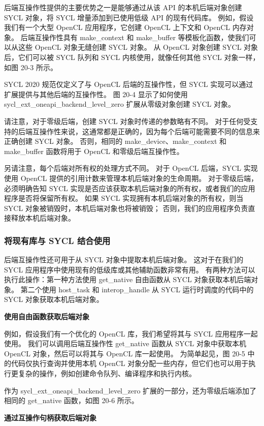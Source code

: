 后端互操作性提供的主要优势之一是能够通过从该 API 的本机后端对象创建 SYCL 对象，将 SYCL 增量添加到已使用低级 API 的现有代码库。 例如，假设我们有一个大型 OpenCL 应用程序，它创建 OpenCL 上下文和 OpenCL 内存对象。 后端互操作性具有 make\_context 和 make\_buffer 等模板化函数，使我们可以从这些 OpenCL 对象无缝创建 SYCL 对象。 从 OpenCL 对象创建 SYCL 对象后，它们可以被 SYCL 队列和 SYCL 内核使用，就像任何其他 SYCL 对象一样，如图 20-3 所示。

SYCL 2020 规范仅定义了与 OpenCL 后端的互操作性，但 SYCL 实现可以通过扩展提供与其他后端的互操作性。 图 20-4 显示了如何使用 sycl\_ext\_oneapi\_backend\_level\_zero 扩展从零级对象创建 SYCL 对象。

请注意，对于零级后端，创建 SYCL 对象时传递的参数略有不同。 对于任何受支持的后端互操作性来说，这通常都是正确的，因为每个后端可能需要不同的信息来正确创建 SYCL 对象。 否则，相同的 make\_device、make\_context 和 make\_buffer 函数将用于 OpenCL 和零级后端互操作性。

另请注意，每个后端对所有权的处理方式不同。 对于 OpenCL 后端，SYCL 实现使用 OpenCL 提供的引用计数来管理本机后端对象的生命周期。 对于零级后端，必须明确告知 SYCL 实现是否应该获取本机后端对象的所有权，或者我们的应用程序是否将保留所有权。 如果 SYCL 实现拥有本机后端对象的所有权，则当 SYCL 对象被销毁时，本机后端对象也将被销毁； 否则，我们的应用程序负责直接释放本机后端对象。

\subsubsection{将现有库与 SYCL 结合使用}
后端互操作性还可用于从 SYCL 对象中提取本机后端对象。 这对于在我们的 SYCL 应用程序中使用现有的低级库或其他辅助函数非常有用。 有两种方法可以执行此操作：第一种方法使用 get\_native 自由函数从 SYCL 对象获取本机后端对象。 第二个使用 host\_task 和 interop\_handle 从 SYCL 运行时调度的代码中的 SYCL 对象获取本机后端对象。

\textbf{使用自由函数获取后端对象}

例如，假设我们有一个优化的 OpenCL 库，我们希望将其与 SYCL 应用程序一起使用。 我们可以调用后端互操作性 get\_native 函数从 SYCL 对象中获取本机 OpenCL 对象，然后可以将其与 OpenCL 库一起使用。 为简单起见，图 20-5 中的代码仅执行查询并使用本机 OpenCL 对象分配一些内存，但它们也可以用于执行更复杂的操作，例如创建命令队列、编译程序和执行内核。

作为 sycl\_ext\_oneapi\_backend\_level\_zero 扩展的一部分，还为零级后端添加了相同的 get\_native 函数，如图 20-6 所示。

\textbf{通过互操作句柄获取后端对象}

